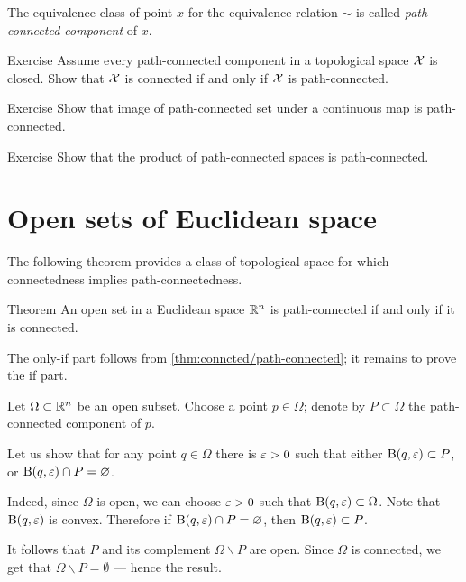 The equivalence class of point $x$ for the equivalence relation $\sim$ is called \emph{path-connected component} of $x$. 

\begin{thm}{Exercise}
Assume every path-connected component in a topological space $\mathcal{X}$ is closed.
Show that $\mathcal{X}$ is connected if and only if $\mathcal{X}$ is path-connected.
\end{thm}

\begin{thm}{Exercise}
Show that image of path-connected set under a continuous map is path-connected.
\end{thm}

\begin{thm}{Exercise}
Show that the product of path-connected spaces is path-connected.
\end{thm}

\section{Open sets of Euclidean space}

The following theorem provides a class of topological space for which connectedness implies path-connectedness.

\begin{thm}{Theorem}
An open set in a Euclidean space $\mathbb{R}^n$ is path-connected if and only if it is connected.
\end{thm}

The only-if part follows from \ref{thm:conncted/path-connected};
it remains to prove the if part.

Let $\Omega\subset\mathbb{R}^n$ be an open subset.
Choose a point $p\in\Omega$; denote by $P\subset \Omega$ the path-connected component of $p$.

Let us show that for any point $q\in \Omega$ there is $\varepsilon>0$ such that either $\mathrm{B}(q,\varepsilon)\subset P$, or $\mathrm{B}(q,\varepsilon)\cap P=\varnothing$.

Indeed, since $\Omega$ is open, we can choose $\varepsilon>0$ such that $\Ball(q,\eps)\z\subset\Omega$.
Note that $\mathrm{B}(q,\varepsilon)$ is convex.
Therefore if $\mathrm{B}(q,\varepsilon)\cap P=\varnothing$, then $\mathrm{B}(q,\varepsilon)\subset P$.

It follows that $P$ and its complement $\Omega\backslash P$ are open.
Since $\Omega$ is connected, we get that $\Omega\backslash P=\emptyset$ --- hence the result.
\qeds



